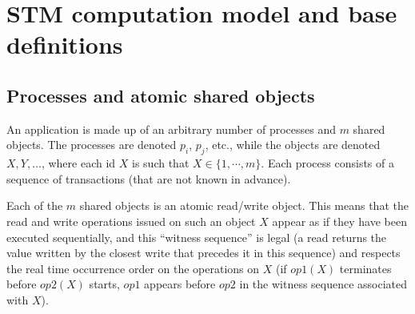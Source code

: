 
















































\section{STM computation model and base definitions}
\label{sec:model-and-conditions}



\subsection{Processes  and atomic shared objects}
An application is made up of  an  arbitrary number  of  processes  and  $m$
shared  objects.  The processes are denoted $p_i$, $p_j$, etc., 
while the  objects are  denoted $X,Y,\ldots$, where each id $X$ is such 
that $X \in \{1,\cdots,m\}$.   Each process consists of  a sequence of 
transactions (that are not known in advance).

Each of the $m$ shared objects is an atomic read/write object. 
This means  that the read and  write operations issued on  such an  object
$X$  appear as  if they have  been executed  sequentially, and this 
``witness sequence'' is  legal (a read returns the value written by the  
closest write  that precedes it in this sequence) and respects the real time 
occurrence  order on the operations on $X$ (if  $op1(X)$  terminates  before
$op2(X)$  starts, $op1$ appears before $op2$ in the witness sequence 
associated with $X$). 




